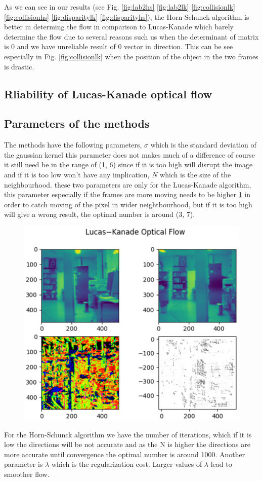 \documentclass[9pt]{IEEEtran}
\begin{document}
As we can see in our results (see Fig. \ref{fig:lab2hs} \ref{fig:lab2lk} \ref{fig:collisionlk} \ref{fig:collisionhs} \ref{fig:disparitylk} \ref{fig:disparityhs}), the Horn-Schunck algorithm is better in determing the flow in comparison to Lucas-Kanade which barely determine the flow due to several reasons such us when the determinant of matrix is 0 and we have unreliable result of 0 vector in direction.
This can be see especially in Fig. \ref{fig:collisionlk} when the position of the object in the two frames is drastic.
\subsection{Rliability of Lucas-Kanade optical flow}
\subsection{Parameters of the methods}
The methods have the following parameters, $\sigma$ which is the standard deviation of the gaussian kernel this parameter does not makes much of a difference of course it still need be in the range of (1, 6) since if it is too high will disrupt the image and if it is too low won't have any implication, $N$ which is the size of the neighbourhood. these two parameters are only for the Lucas-Kanade algorithm, this parameter especially if the frames are more moving needs to be higher \ref{fig:lab2lk7} in order to catch moving of the pixel in wider neightbourhood, but if it is too high will give a wrong result, the optimal number is around (3, 7).
\begin{figure}[h]
    \centering
    \includegraphics[width=1\columnwidth, scale=0.5]{lab2lk7.eps}
    \label{fig:lab2lk7}
\end{figure}
For the Horn-Schunck algorithm we have the number of iterations, which if it is low the directions will be not accurate and as the N is higher the directions are more accurate until convergence the optimal number is around 1000.
Another parameter is $\lambda$ which is the regularization cost. Larger values of $\lambda$ lead to smoother flow.
\end{document}
